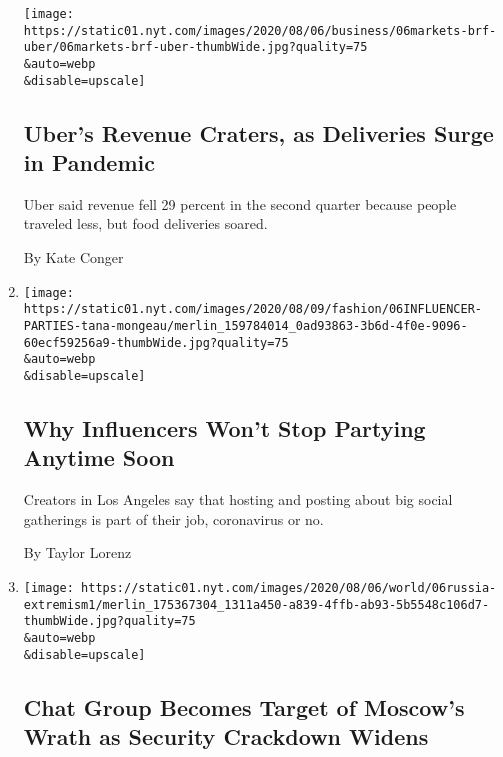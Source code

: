 \begin{enumerate}
  \texttt{[image: https://static01.nyt.com/images/2020/08/06/business/06markets-brf-uber/06markets-brf-uber-thumbWide.jpg?quality=75\\\&auto=webp\\\&disable=upscale]}

  \hypertarget{ubers-revenue-craters-as-deliveries-surge-in-pandemic}{%
  \subsection{Uber's Revenue Craters, as Deliveries Surge in
  Pandemic}\label{ubers-revenue-craters-as-deliveries-surge-in-pandemic}}

  Uber said revenue fell 29 percent in the second quarter because people
  traveled less, but food deliveries soared.

  By Kate Conger
\item
  \href{/2020/08/06/style/influencer-parties-jake-paul-tana-mongeau-thomas-petrou-hype-house.html}{}

  \texttt{[image: https://static01.nyt.com/images/2020/08/09/fashion/06INFLUENCER-PARTIES-tana-mongeau/merlin\_159784014\_0ad93863-3b6d-4f0e-9096-60ecf59256a9-thumbWide.jpg?quality=75\\\&auto=webp\\\&disable=upscale]}

  \hypertarget{why-influencers-wont-stop-partying-anytime-soon}{%
  \subsection{Why Influencers Won't Stop Partying Anytime
  Soon}\label{why-influencers-wont-stop-partying-anytime-soon}}

  Creators in Los Angeles say that hosting and posting about big social
  gatherings is part of their job, coronavirus or no.

  By Taylor Lorenz
\item
  \href{/2020/08/06/world/europe/russia-extremisim-chat-group-sentence.html}{}

  \texttt{[image: https://static01.nyt.com/images/2020/08/06/world/06russia-extremism1/merlin\_175367304\_1311a450-a839-4ffb-ab93-5b5548c106d7-thumbWide.jpg?quality=75\\\&auto=webp\\\&disable=upscale]}

  \hypertarget{chat-group-becomes-target-of-moscows-wrath-as-security-crackdown-widens}{%
  \subsection{Chat Group Becomes Target of Moscow's Wrath as Security
  Crackdown
  Widens}\label{chat-group-becomes-target-of-moscows-wrath-as-security-crackdown-widens}}


\end{enumerate}
